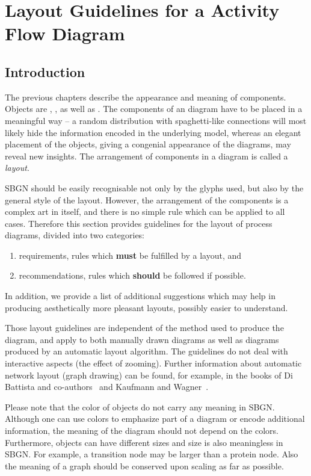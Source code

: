 \chapter{Layout Guidelines for a Activity Flow Diagram}
\label{chp:af:layout}

\section{Introduction}

The previous chapters describe the appearance and meaning of
\SBGNAFLone components. Objects are , ,
 as well as .
The components of an \AF diagram have to be placed in a meaningful way -- a random
distribution with spaghetti-like connections will most likely hide
the information encoded in the underlying model, whereas an elegant
placement of the objects, giving a congenial appearance of the
diagrams, may reveal new insights. The arrangement of components in a
diagram is called a \emph{layout}.

SBGN \AFs should be easily recognisable not only by the
glyphs used, but also by the general style of the layout. However, the
arrangement of the components is a complex art in itself, and there is
no simple rule which can be applied to all cases. Therefore this
section provides guidelines for the layout of process diagrams, divided
into two categories:
\begin{enumerate}
  \item requirements, \ie rules which \textbf{must} be fulfilled by a
  layout, and
  \item recommendations, \ie rules which \textbf{should} be followed if
  possible.
\end{enumerate}
In addition, we provide a list of additional suggestions which may help in
producing aesthetically more pleasant layouts, possibly easier to understand.

Those layout guidelines are independent of the method used to produce
the diagram, and apply to both manually drawn diagrams as well as
diagrams produced by an automatic layout algorithm. The guidelines do
not deal with interactive aspects (\eg the effect of zooming).
Further information about automatic network layout
(graph drawing) can be found, for example, in the books of Di Battista and
co-authors~\cite{DiBattista:1998} and Kaufmann and Wagner~\cite{Kaufmann:2001}.

Please note that the color of objects do not carry any meaning in
SBGN. Although one can use colors to emphasize part of a diagram or
encode additional information, the meaning of the diagram should not
depend on the colors. Furthermore, objects can have different sizes
and size is also meaningless in SBGN. For example, a transition node
may be larger than a protein node. Also the meaning of a graph
should be conserved upon scaling as far as possible.

